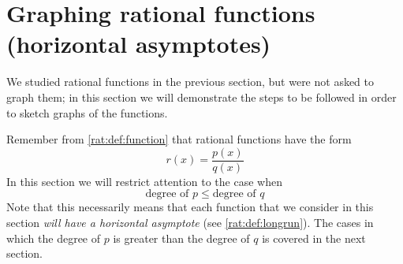 \section{Graphing rational functions (horizontal asymptotes)}
 We studied rational functions in the previous section, but were 
 not asked to graph them; in this section we will demonstrate the 
 steps to be followed in order to sketch graphs of the functions. 
    
 Remember from \vref{rat:def:function} that rational functions have 
 the form
 \[
 	r(x)=\frac{p(x)}{q(x)}
 \]
 In this section we will restrict attention to the case when 
 \[
 	\text{degree of }p\leq \text{degree of }q
 \]
 Note that this necessarily means that each function that we consider
 in this section \emph{will have a horizontal asymptote} (see \vref{rat:def:longrun}).
 The cases in which the degree of $p$ is greater than the degree of $q$ 
 is covered in the next section.
    
